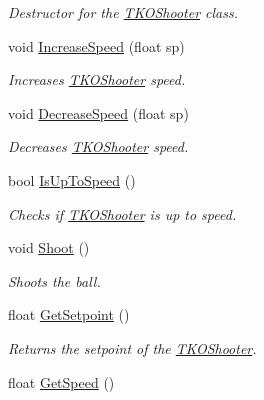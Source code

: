 \begin{DoxyCompactItemize}
\begin{DoxyCompactList}\small\item\em Destructor for the \hyperlink{class_t_k_o_shooter}{T\-K\-O\-Shooter} class. \end{DoxyCompactList}\item 
void \hyperlink{class_t_k_o_shooter_a7a17d08c1435f7a0e200d4309784af5b}{Increase\-Speed} (float sp)
\begin{DoxyCompactList}\small\item\em Increases \hyperlink{class_t_k_o_shooter}{T\-K\-O\-Shooter} speed. \end{DoxyCompactList}\item 
void \hyperlink{class_t_k_o_shooter_affb81e799fbb4bb327d6a9d65df968a9}{Decrease\-Speed} (float sp)
\begin{DoxyCompactList}\small\item\em Decreases \hyperlink{class_t_k_o_shooter}{T\-K\-O\-Shooter} speed. \end{DoxyCompactList}\item 
bool \hyperlink{class_t_k_o_shooter_a3d5394ebe40c0112519cf50290e99dca}{Is\-Up\-To\-Speed} ()
\begin{DoxyCompactList}\small\item\em Checks if \hyperlink{class_t_k_o_shooter}{T\-K\-O\-Shooter} is up to speed. \end{DoxyCompactList}\item 
void \hyperlink{class_t_k_o_shooter_ab3b3f27ccb68e0d2f17beacdf866c6d7}{Shoot} ()
\begin{DoxyCompactList}\small\item\em Shoots the ball. \end{DoxyCompactList}\item 
float \hyperlink{class_t_k_o_shooter_a8f00fad59ad921c64dc3c95ce656fb6a}{Get\-Setpoint} ()
\begin{DoxyCompactList}\small\item\em Returns the setpoint of the \hyperlink{class_t_k_o_shooter}{T\-K\-O\-Shooter}. \end{DoxyCompactList}\item 
\hypertarget{class_t_k_o_shooter_a60a892c5dbce0e1df280b34a8bbb9e64}{float \hyperlink{class_t_k_o_shooter_a60a892c5dbce0e1df280b34a8bbb9e64}{Get\-Speed} ()}\label{class_t_k_o_shooter_a60a892c5dbce0e1df280b34a8bbb9e64}


\end{DoxyCompactItemize}
